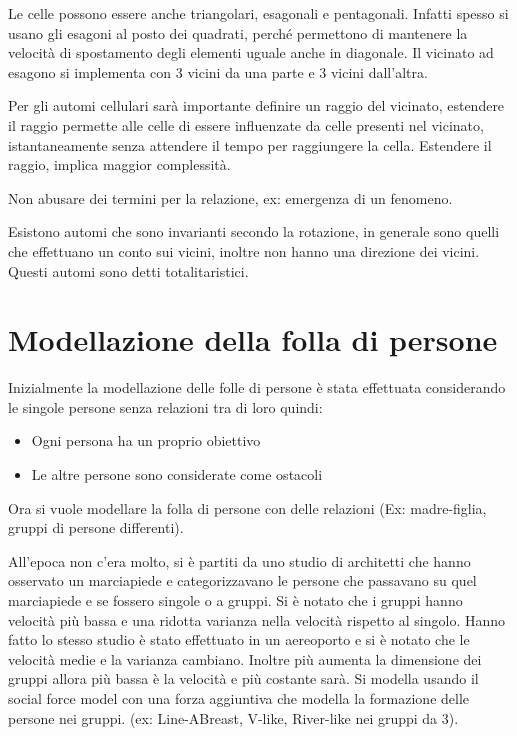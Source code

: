 \begin{nota}
    Le celle possono essere anche triangolari, esagonali e pentagonali. Infatti 
    spesso si usano gli esagoni al posto dei quadrati, perché permettono di mantenere
    la velocità di spostamento degli elementi uguale anche in diagonale. Il vicinato 
    ad esagono si implementa con 3 vicini da una parte e 3 vicini dall'altra.
\end{nota}

Per gli automi cellulari sarà importante definire un raggio del vicinato, estendere 
il raggio permette alle celle di essere influenzate da celle presenti nel vicinato,
istantaneamente senza attendere il tempo per raggiungere la cella. Estendere il 
raggio, implica maggior complessità.

\begin{nota}
    Non abusare dei termini per la relazione, ex: emergenza di un fenomeno.    
\end{nota}

Esistono automi che sono invarianti secondo la rotazione, in generale sono 
quelli che effettuano un conto sui vicini, inoltre non hanno una direzione dei vicini. 
Questi automi sono detti totalitaristici.

\section{Modellazione della folla di persone}
Inizialmente la modellazione delle folle di persone è stata effettuata considerando 
le singole persone senza relazioni tra di loro quindi:
\begin{itemize}
    \item Ogni persona ha un proprio obiettivo
    \item Le altre persone sono considerate come ostacoli
\end{itemize}

Ora si vuole modellare la folla di persone con delle relazioni (Ex: madre-figlia,
gruppi di persone differenti). 

All'epoca non c'era molto, si è partiti da uno studio di architetti che hanno 
osservato un marciapiede e categorizzavano le persone che passavano su quel marciapiede 
e se fossero singole o a gruppi. Si è notato che i gruppi hanno velocità più bassa e 
una ridotta varianza nella velocità rispetto al singolo. Hanno fatto lo stesso 
studio è stato effettuato in un aereoporto e si è notato che le velocità medie e la varianza 
cambiano. Inoltre più aumenta la dimensione dei gruppi allora più bassa è la velocità
e più costante sarà. Si modella usando il social force model con una forza aggiuntiva 
che modella la formazione delle persone nei gruppi. (ex: Line-ABreast, V-like, River-like nei gruppi da 3).

